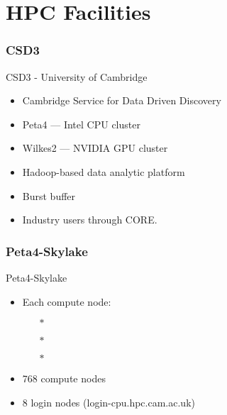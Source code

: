 \part{HPC Facilities}
\begin{frame}
\partpage
\end{frame}

\section{CSD3}
\begin{frame}{CSD3 - University of Cambridge}
\begin{itemize}
\item{Cambridge Service for Data Driven Discovery}
\pause
\medskip
\item{\alert{Peta4 --- Intel CPU cluster}}
\pause
\item{\alert{Wilkes2 --- NVIDIA GPU cluster}}
\pause
\medskip
\item{Hadoop-based data analytic platform}
\item{Burst buffer}
\item{Industry users through CORE.}
\end{itemize}
\end{frame}

\section{Peta4-Skylake}
\begin{frame}{Peta4-Skylake}
\begin{itemize}
\item{Each compute node:}
\begin{itemize}
\item[$\ast$]{}
\item[$\ast$]{}
\item[$\ast$]{}
\end{itemize}
\item{768 compute nodes}
\item{8 login nodes (\alert{login-cpu.hpc.cam.ac.uk})}
\end{itemize}
\end{frame}

